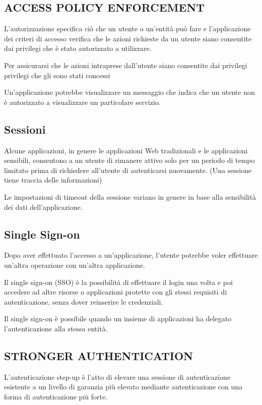\subsection{ACCESS POLICY ENFORCEMENT}

L'autorizzazione specifica ciò che un utente o un'entità può fare e l'applicazione dei criteri di accesso verifica che le azioni richieste da un utente siano consentite dai privilegi che è stato autorizzato a utilizzare.

Per assicurarsi che le azioni intraprese dall'utente siano consentite dai privilegi privilegi che gli sono stati concessi

Un'applicazione potrebbe visualizzare un messaggio che indica che un utente
non è autorizzato a visualizzare un particolare servizio.

\subsection{Sessioni}

Alcune applicazioni, in genere le applicazioni Web tradizionali e le applicazioni sensibili, consentono a un utente di rimanere attivo solo per un periodo di tempo limitato prima di richiedere all'utente di autenticarsi nuovamente.
(Una sessione tiene traccia delle informazioni)

Le impostazioni di timeout della sessione variano in genere in base alla sensibilità dei dati dell'applicazione.

\subsection{Single Sign-on}

Dopo aver effettuato l'accesso a un'applicazione, l'utente potrebbe voler effettuare un'altra operazione con un'altra applicazione. 

Il single sign-on (SSO) è la possibilità di effettuare il login una volta e poi accedere ad altre risorse o applicazioni protette con gli stessi requisiti di autenticazione, senza dover reinserire le credenziali.

Il single sign-on è possibile quando un insieme di applicazioni ha delegato l'autenticazione alla stessa entità. 


\subsection{STRONGER AUTHENTICATION}

L'autenticazione step-up è l'atto di elevare una sessione di autenticazione esistente a un livello di garanzia più elevato mediante
autenticazione con una forma di autenticazione più forte.


